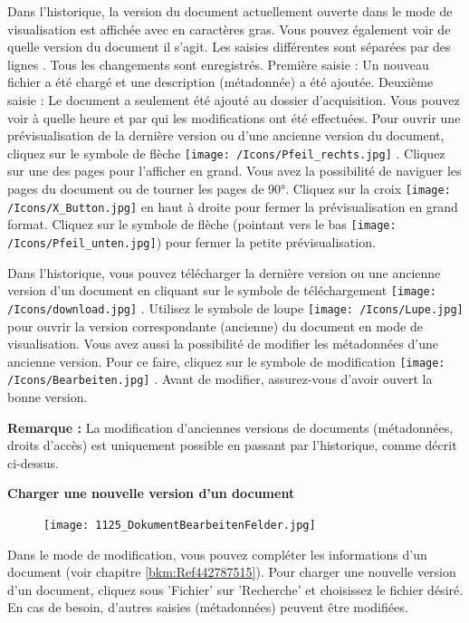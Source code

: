  Dans l'historique, la version du document actuellement ouverte dans le mode de visualisation est affichée avec en caractères gras. Vous pouvez également voir de quelle version du document il s'agit. Les saisies différentes sont séparées par des lignes . Tous les changements sont enregistrés. Première saisie : Un nouveau fichier a été chargé et une description (métadonnée) a été ajoutée. Deuxième saisie : Le document a seulement été ajouté au dossier d'acquisition. Vous pouvez voir à quelle heure et par qui les modifications ont été effectuées. Pour ouvrir une prévisualisation de la dernière version ou d'une ancienne version du document, cliquez sur le symbole de flèche \texttt{[image: /Icons/Pfeil\_rechts.jpg]} . Cliquez sur une des pages pour l'afficher en grand. Vous avez la possibilité de naviguer les pages du document ou de tourner les pages de 90°. Cliquez sur la croix \texttt{[image: /Icons/X\_Button.jpg]} en haut à droite pour fermer la prévisualisation en grand format. Cliquez sur le symbole de flèche (pointant vers le bas \texttt{[image: /Icons/Pfeil\_unten.jpg]}) pour fermer la petite prévisualisation.

Dans l'historique, vous pouvez télécharger la dernière version ou une ancienne version d'un document en cliquant sur le symbole de téléchargement \texttt{[image: /Icons/download.jpg]} . Utilisez le symbole de loupe \texttt{[image: /Icons/Lupe.jpg]}  pour ouvrir la version correspondante (ancienne) du document en mode de visualisation. Vous avez aussi la possibilité de modifier les métadonnées d'une ancienne version. Pour ce faire, cliquez sur le symbole de modification \texttt{[image: /Icons/Bearbeiten.jpg]} . Avant de modifier, assurez-vous d'avoir ouvert la bonne version.

\vspace{\baselineskip}

\textbf{Remarque :} La modification d'anciennes versions de documents (métadonnées, droits d'accès) est uniquement possible en passant par l'historique, comme décrit ci-dessus.

\pagebreak

\textbf{Charger une nouvelle version d'un document}

\vspace{\baselineskip}

\begin{figure}
\vspace{-35pt}
\texttt{[image: 1125\_DokumentBearbeitenFelder.jpg]}
\end{figure}
Dans le mode de modification, vous pouvez compléter les informations d'un document (voir chapitre \ref{bkm:Ref442787515}). Pour charger une nouvelle version d'un document, cliquez sous 'Fichier' sur 'Recherche'  et choisissez le fichier désiré. En cas de besoin, d'autres saisies (métadonnées) peuvent être modifiées.


